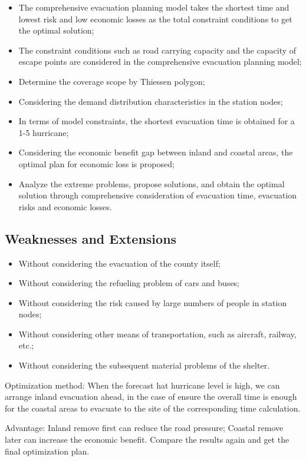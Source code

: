 \documentclass{mcmthesis}	%
\begin{document}
\begin{itemize}
  \item The comprehensive evacuation planning model takes the shortest time and lowest risk and low economic losses as the total constraint conditions to get the optimal solution;
  \item The constraint conditions such as road carrying capacity and the capacity of escape points are considered in the comprehensive evacuation planning model;
  \item Determine the coverage scope by Thiessen polygon;
  \item Considering the demand distribution characteristics in the station nodes;
  \item In terms of model constraints, the shortest evacuation time is obtained for a 1-5 hurricane;
  \item Considering the economic benefit gap between inland and coastal areas, the optimal plan for economic loss is proposed;
  \item Analyze the extreme problems, propose solutions, and obtain the optimal solution through comprehensive consideration of evacuation time, evacuation risks and economic losses.
\end{itemize}

\subsection{Weaknesses and Extensions}
\begin{itemize}
  \item Without considering the evacuation of the county itself;
  \item Without considering the refueling problem of cars and buses;
  \item Without considering the risk caused by large numbers of people in station nodes;
  \item Without considering other means of transportation, such as aircraft, railway, etc.;
  \item Without considering the subsequent material problems of the shelter.
\end{itemize}

Optimization method: When the forecast hat hurricane level is high, we can arrange inland evacuation ahead, in the case of ensure the overall time is enough for the coastal areas to evacuate to the site of the corresponding time calculation.

Advantage: Inland remove first can reduce the road pressure; Coastal remove later can increase the economic benefit. Compare the results again and get the final optimization plan.
\end{document}
